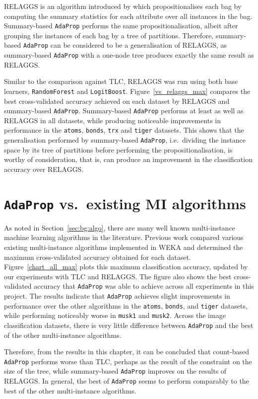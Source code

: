 \documentclass[a4paper,12pt]{report} %
\newcommand{\AdaProp}{\texttt{AdaProp}\xspace}
\newcommand{\blRF}{\texttt{RandomForest}\xspace}
\newcommand{\blLB}{\texttt{LogitBoost}\xspace}
\newcommand{\tdsMA}{\texttt{atoms}\xspace}
\newcommand{\tdsMB}{\texttt{bonds}\xspace}
\newcommand{\tdsMU}{\texttt{musk1}\xspace}
\newcommand{\tdsMK}{\texttt{musk2}\xspace}
\newcommand{\tdsTX}{\texttt{trx}\xspace}
\newcommand{\tdsTG}{\texttt{tiger}\xspace}
\begin{document}
RELAGGS is an algorithm introduced by  which propositionalises 
	each bag by computing the summary statistics for each attribute over all instances in the bag.
Summary-based \AdaProp performs the same propositionalisation, albeit after
	grouping the instances of each bag by a tree of partitions.
Therefore, summary-based \AdaProp can be considered to be a generalisation of RELAGGS, 
	as summary-based \AdaProp with a one-node tree produces exactly the same result as RELAGGS.

Similar to the comparison against TLC, RELAGGS was run using both base learners, \blRF and \blLB.
Figure~\ref{vs_relaggs_max} compares the best cross-validated accuracy achieved on each dataset by RELAGGS and 
	summary-based \AdaProp.
Summary-based \AdaProp performs at least as well as RELAGGS in all datasets, 
	while producing noticeable improvements in performance in the 
		\tdsMA, \tdsMB, \tdsTX and \tdsTG datasets.
This shows that the generalisation performed by summary-based \AdaProp, 
	i.e.\ dividing the instance space by its tree of partitions before performing the propositionalisation,
	is worthy of consideration, that is, can produce an improvement in the classification accuracy over RELAGGS.

\section{\AdaProp vs.\  existing MI algorithms}

As noted in Section~\ref{sec:bg:algo}, there are many well known
	multi-instance machine learning algorithms in the literature.
Previous work \cite{reMiles} compared various existing multi-instance algorithms implemented in WEKA 
	and determined the maximum cross-validated accuracy obtained for each dataset.
Figure~\ref{chart_all_max} plots this maximum classification accuracy, 
	updated by our experiments with TLC and RELAGGS.
The figure also shows the best cross-validated accuracy that \AdaProp was able to achieve 
	across all experiments in this project.
The results indicate that 
	\AdaProp achieves slight improvements in performance over the other 
	algorithms in the \tdsMA, \tdsMB, and \tdsTG datasets, while performing
	noticeably worse in \tdsMU and \tdsMK.
Across the image classification datasets, there is very little difference between
	 \AdaProp and the best of the other multi-instance algorithms.

Therefore, from the results in this chapter, 
	it can be concluded that count-based \AdaProp performs worse than TLC,
	perhaps as the result of the constraint on the size of the tree, 
	while summary-based \AdaProp improves on the results of RELAGGS.
In general, the best of \AdaProp seems to perform comparably to the best of the other multi-instance algorithms.
\end{document}
